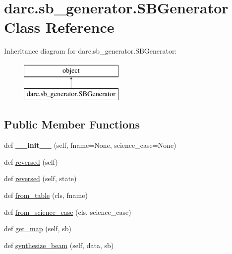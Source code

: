\hypertarget{classdarc_1_1sb__generator_1_1_s_b_generator}{}\section{darc.\+sb\+\_\+generator.\+S\+B\+Generator Class Reference}
\label{classdarc_1_1sb__generator_1_1_s_b_generator}
Inheritance diagram for darc.\+sb\+\_\+generator.\+S\+B\+Generator\+:\begin{figure}[H]
\begin{center}
\leavevmode
\includegraphics[height=2.000000cm]{classdarc_1_1sb__generator_1_1_s_b_generator}
\end{center}
\end{figure}
\subsection*{Public Member Functions}
\begin{DoxyCompactItemize}
\item 
\mbox{\label{classdarc_1_1sb__generator_1_1_s_b_generator_a3ca311b668aeb8d99df5282a4dee32fa}} 
def {\bfseries \+\_\+\+\_\+init\+\_\+\+\_\+} (self, fname=None, science\+\_\+case=None)
\item 
def \mbox{\hyperlink{classdarc_1_1sb__generator_1_1_s_b_generator_a295b024cfb66ca6a406e47d8e7b02022}{reversed}} (self)
\item 
def \mbox{\hyperlink{classdarc_1_1sb__generator_1_1_s_b_generator_a5d4732f17f1554641731037837b83bd3}{reversed}} (self, state)
\item 
def \mbox{\hyperlink{classdarc_1_1sb__generator_1_1_s_b_generator_a4b2a0826577d1e8b9543e3bdfee45d50}{from\+\_\+table}} (cls, fname)
\item 
def \mbox{\hyperlink{classdarc_1_1sb__generator_1_1_s_b_generator_ada1aac570d341d6859eee1ccb0f6d105}{from\+\_\+science\+\_\+case}} (cls, science\+\_\+case)
\item 
def \mbox{\hyperlink{classdarc_1_1sb__generator_1_1_s_b_generator_acf7a02329efc10c20717096c28e322ad}{get\+\_\+map}} (self, sb)
\item 
def \mbox{\hyperlink{classdarc_1_1sb__generator_1_1_s_b_generator_a57e1d0271123a9594396edf9671bba4d}{synthesize\+\_\+beam}} (self, data, sb)
\end{DoxyCompactItemize}
